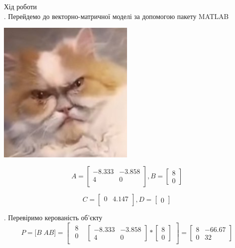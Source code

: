 \documentclass[a4paper]{article}
\begin{document}
Хід роботи\\

\hfill \break
{}. Перейдемо до векторно-матричної моделі за допомогою пакету
MATLAB\\

\begin{center}
\includegraphics[width=0.5\textwidth]{functionInit}
\end{center}

\[
A =
\begin{bmatrix}
    -8.333 & -3.858 \\
    4 & 0 \\
\end{bmatrix},
B =
\begin{bmatrix}
    8 \\ 0
\end{bmatrix}
\]

\[
C =
\begin{bmatrix}
    0 & 4.147 \\
\end{bmatrix},
D =
\begin{bmatrix}
    0
\end{bmatrix}
\]

\hfill \break
{}. Перевіримо керованість об’єкту\\

\[
P = \big[ B \; AB \big] = 
\left[ 
  \begin{array}{cc}

\begin{matrix}
8 \\
0 \\
\end{matrix}
 & \begin{bmatrix}
-8.333 & -3.858 \\
4 & 0
\end{bmatrix} * 
\begin{bmatrix}
8 \\ 0
\end{bmatrix}
\end{array}\right]
=
\begin{bmatrix}
8 & -66.67 \\
0 & 32
\end{bmatrix}
\]
\end{document}
